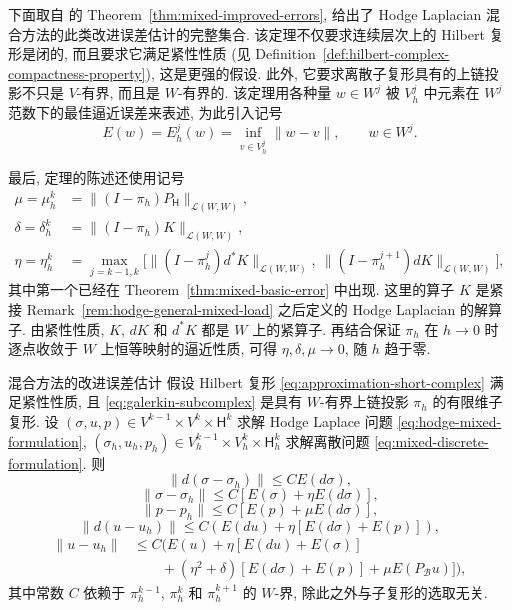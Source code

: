 下面取自  的 Theorem~\ref{thm:mixed-improved-errors}, 给出了 Hodge Laplacian 混合方法的此类改进误差估计的完整集合. 该定理不仅要求连续层次上的 Hilbert 复形是闭的, 而且要求它满足紧性性质 (见 Definition~\ref{def:hilbert-complex-compactness-property}), 这是更强的假设. 此外, 它要求离散子复形具有的上链投影不只是 $V$-有界, 而且是 $W$-有界的. 该定理用各种量 $w\in W^j$ 被 $V_h^j$ 中元素在 $W^j$ 范数下的最佳逼近误差来表述, 为此引入记号
\[
E(w)=E_h^j(w)=\inf_{v\in V_h^j}\|w-v\|,\qquad w\in W^j.
\]

最后, 定理的陈述还使用记号
\[
\begin{aligned}
\mu=\mu_h^k&=\|(I-\pi_h)P_{\mathsf H}\|_{\mathcal L(W,W)},\\
\delta=\delta_h^k&=\|(I-\pi_h)K\|_{\mathcal L(W,W)},\\
\eta=\eta_h^k&=\max_{j=k-1,k}\big[\|(I-\pi_h^j)d^*K\|_{\mathcal L(W,W)},\ \|(I-\pi_h^{j+1})dK\|_{\mathcal L(W,W)}\big],
\end{aligned}
\]
其中第一个已经在 Theorem~\ref{thm:mixed-basic-error} 中出现. 这里的算子 $K$ 是紧接 Remark~\ref{rem:hodge-general-mixed-load} 之后定义的 Hodge Laplacian 的解算子. 由紧性性质, $K$, $dK$ 和 $d^*K$ 都是 $W$ 上的紧算子. 再结合保证 $\pi_h$ 在 $h\to0$ 时逐点收敛于 $W$ 上恒等映射的逼近性质, 可得 $\eta,\delta,\mu\to0$, 随 $h$ 趋于零.

\begin{Theorem}{{混合方法的改进误差估计}}\label{thm:mixed-improved-errors}
假设 Hilbert 复形 \eqref{eq:approximation-short-complex} 满足紧性性质, 且 \eqref{eq:galerkin-subcomplex} 是具有 $W$-有界上链投影 $\pi_h$ 的有限维子复形. 设 $(\sigma,u,p)\in V^{k-1}\times V^k\times\mathsf H^k$ 求解 Hodge Laplace 问题 \eqref{eq:hodge-mixed-formulation}, $(\sigma_h,u_h,p_h)\in V_h^{k-1}\times V_h^k\times\mathsf H_h^k$ 求解离散问题 \eqref{eq:mixed-discrete-formulation}. 则
\begin{equation}\label{eq:mixed-improved-dsigma}
\|d(\sigma-\sigma_h)\|\leq CE(d\sigma),
\end{equation}
\begin{equation}\label{eq:mixed-improved-sigma}
\|\sigma-\sigma_h\|\leq C[E(\sigma)+\eta E(d\sigma)],
\end{equation}
\begin{equation}\label{eq:mixed-improved-p}
\|p-p_h\|\leq C[E(p)+\mu E(d\sigma)],
\end{equation}
\begin{equation}\label{eq:mixed-improved-du}
\|d(u-u_h)\|\leq C(E(du)+\eta[E(d\sigma)+E(p)]),
\end{equation}
\begin{equation}\label{eq:mixed-improved-u}
\begin{aligned}
\|u-u_h\|&\leq C\big(E(u)+\eta[E(du)+E(\sigma)]\\
&\qquad+(\eta^2+\delta)[E(d\sigma)+E(p)]+\mu E(P_{\mathcal B}u)]\big),
\end{aligned}
\end{equation}
其中常数 $C$ 依赖于 $\pi_h^{k-1}$, $\pi_h^k$ 和 $\pi_h^{k+1}$ 的 $W$-界, 除此之外与子复形的选取无关.
\end{Theorem}

